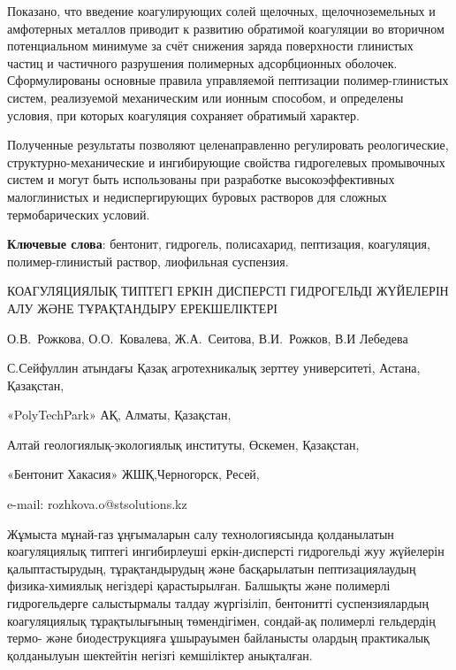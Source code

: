 Показано, что введение коагулирующих солей щелочных, щелочноземельных и
амфотерных металлов приводит к развитию обратимой коагуляции во
вторичном потенциальном минимуме за счёт снижения заряда поверхности
глинистых частиц и частичного разрушения полимерных адсорбционных
оболочек. Сформулированы основные правила управляемой пептизации
полимер-глинистых систем, реализуемой механическим или ионным способом,
и определены условия, при которых коагуляция сохраняет обратимый
характер.

Полученные результаты позволяют целенаправленно регулировать
реологические, структурно-механические и ингибирующие свойства
гидрогелевых промывочных систем и могут быть использованы при разработке
высокоэффективных малоглинистых и недиспергирующих буровых растворов для
сложных термобарических условий.

{\bfseries Ключевые слова}: бентонит, гидрогель, полисахарид, пептизация,
коагуляция, полимер-глинис\-тый раствор, лиофильная суспензия.

\begin{header}
КОАГУЛЯЦИЯЛЫҚ ТИПТЕГІ ЕРКІН ДИСПЕРСТІ ГИДРОГЕЛЬДІ ЖҮЙЕЛЕРІН АЛУ ЖӘНЕ ТҰРАҚТАНДЫРУ ЕРЕКШЕЛІКТЕРІ

О.В.~Рожкова\envelope,
О.О.~Ковалева,
Ж.А.~Сеитова,
В.И.~Рожков,
В.И Лебедева
\end{header}

\begin{affil}
С.Сейфуллин атындағы Қазақ агротехникалық зерттеу университеті, Астана, Қазақстан,

«PolyTechPark» АҚ, Алматы, Қазақстан,

Алтай геологиялық-экологиялық институты, Өскемен, Қазақстан,

«Бентонит Хакасия» ЖШҚ,Черногорск, Ресей,

e-mail: rozhkova.o@stsolutions.kz
\end{affil}

Жұмыста мұнай-газ ұңғымаларын салу технологиясында қолданылатын
коагуляциялық типтегі ингибирлеуші еркін-дисперсті гидрогельді жуу
жүйелерін қалыптастырудың, тұрақтандырудың және басқарылатын
пептизациялаудың физика-химиялық негіздері қарастырылған. Балшықты және
полимерлі гидрогельдерге салыстырмалы талдау жүргізіліп, бентонитті
суспензиялардың коагуляциялық тұрақтылығының төмендігімен, сондай-ақ
полимерлі гельдердің термо- және биодеструкцияға ұшырауымен байланысты
олардың практикалық қолданылуын шектейтін негізгі кемшіліктер
анықталған.


